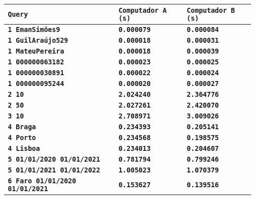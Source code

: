 \documentclass[12pt,a4paper]{report}
\begin{document}
{
\setlength\arrayrulewidth{1pt}
\begin{tabularx}{\textwidth} { 
  | >{\centering\arraybackslash}X
  | >{\centering\arraybackslash}X
  | >{\centering\arraybackslash}X | }
 \hline
 \texttt{\textbf{Query}} & \texttt{\textbf{Computador A (s)}} & \texttt{\textbf{Computador B (s)}} \\
 \hline
 \texttt{\textbf{1 EmanSimões9}} & \texttt{\textbf{0.000079}} & \texttt{\textbf{0.000084}} \\
 \hline
 \texttt{\textbf{1 GuilAraújo529}} & \texttt{\textbf{0.000018}} & \texttt{\textbf{0.000031}} \\
 \hline
 \texttt{\textbf{1 MateuPereira}} & \texttt{\textbf{0.000018}} & \texttt{\textbf{0.000039}} \\
 \hline
 \texttt{\textbf{1 000000063182}} & \texttt{\textbf{0.000023}} & \texttt{\textbf{0.000025}} \\
 \hline
 \texttt{\textbf{1 000000030891}} & \texttt{\textbf{0.000022}} & \texttt{\textbf{0.000024}} \\
 \hline
 \texttt{\textbf{1 000000095244}} & \texttt{\textbf{0.000020}} & \texttt{\textbf{0.000027}} \\
 \hline
 \texttt{\textbf{2 10}} & \texttt{\textbf{2.024240}} & \texttt{\textbf{2.364776}} \\
 \hline
 \texttt{\textbf{2 50}} & \texttt{\textbf{2.027261}} & \texttt{\textbf{2.420070}} \\
 \hline
 \texttt{\textbf{3 10}} & \texttt{\textbf{2.708971}} & \texttt{\textbf{3.009026}} \\
 \hline
 \texttt{\textbf{4 Braga}} & \texttt{\textbf{0.234393}} & \texttt{\textbf{0.205141}} \\
 \hline
 \texttt{\textbf{4 Porto}} & \texttt{\textbf{0.234568}} & \texttt{\textbf{0.198575}} \\
 \hline
 \texttt{\textbf{4 Lisboa}} & \texttt{\textbf{0.234013}} & \texttt{\textbf{0.204607}} \\
 \hline
 \texttt{\textbf{5 01/01/2020 01/01/2021}} & \vspace{-5pt}\texttt{\textbf{0.781794}} & \vspace{-5pt}\texttt{\textbf{0.799246}} \\
 \hline
 \texttt{\textbf{5 01/01/2021 01/01/2022}} & \vspace{-5pt}\texttt{\textbf{1.005023}} & \vspace{-5pt}\texttt{\textbf{1.070379}} \\
 \hline
 \texttt{\textbf{6 Faro 01/01/2020 01/01/2021}} & \vspace{-5pt}\texttt{\textbf{0.153627}} & \vspace{-5pt}\texttt{\textbf{0.139516}} \\

\end{tabularx}}
\end{document}
